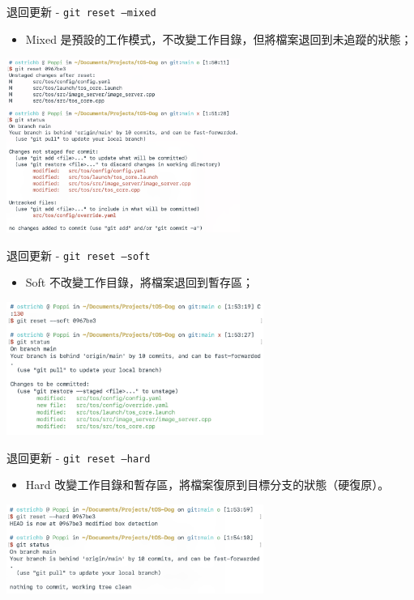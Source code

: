 \documentclass[xetex, unicode, 10pt, aspectratio=169]{beamer}
\begin{document}
\begin{frame}{退回更新 - \texttt{git reset --mixed}}
    \begin{itemize}
        \item Mixed 是預設的工作模式，不改變工作目錄，但將檔案退回到未追蹤的狀態；
    \end{itemize}
    \begin{center}
        \includegraphics[width=3.0in]{./img/git-reset-mixed.png}
    \end{center}
\end{frame}

\begin{frame}{退回更新 - \texttt{git reset --soft}}
    \begin{itemize}
        \item Soft 不改變工作目錄，將檔案退回到暫存區；
    \end{itemize}
    \begin{center}
        \includegraphics[width=3.3in]{./img/git-reset-soft.png}
    \end{center}
\end{frame}

\begin{frame}{退回更新 - \texttt{git reset --hard}}
    \begin{itemize}
        \item Hard 改變工作目錄和暫存區，將檔案復原到目標分支的狀態（硬復原）。
    \end{itemize}
    \begin{center}
        \includegraphics[width=3.3in]{./img/git-reset-hard.png}
    \end{center}
\end{frame}
\end{document}
